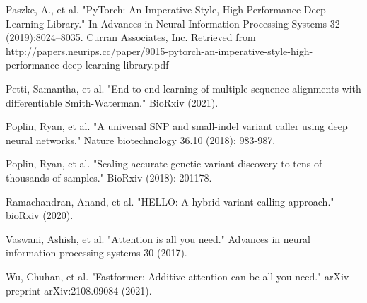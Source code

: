 \documentclass[]{article}
\begin{document}
 
\vspace{8pt}
Paszke, A., et al. "PyTorch: An Imperative Style, High-Performance Deep Learning Library." In Advances in Neural Information Processing Systems 32 (2019):8024–8035. Curran Associates, Inc. Retrieved from http://papers.neurips.cc/paper/9015-pytorch-an-imperative-style-high-performance-deep-learning-library.pdf

\vspace{8pt}
Petti, Samantha, et al. "End-to-end learning of multiple sequence alignments with differentiable Smith-Waterman." BioRxiv (2021).

\vspace{8pt}
Poplin, Ryan, et al. "A universal SNP and small-indel variant caller using deep neural networks." Nature biotechnology 36.10 (2018): 983-987.

\vspace{8pt}
Poplin, Ryan, et al. "Scaling accurate genetic variant discovery to tens of thousands of samples." BioRxiv (2018): 201178.

\vspace{8pt}
Ramachandran, Anand, et al. "HELLO: A hybrid variant calling approach." bioRxiv (2020).
 

\vspace{8pt}
Vaswani, Ashish, et al. "Attention is all you need." Advances in neural information processing systems 30 (2017).


\vspace{8pt}
Wu, Chuhan, et al. "Fastformer: Additive attention can be all you need." arXiv preprint arXiv:2108.09084 (2021).
\end{document}
